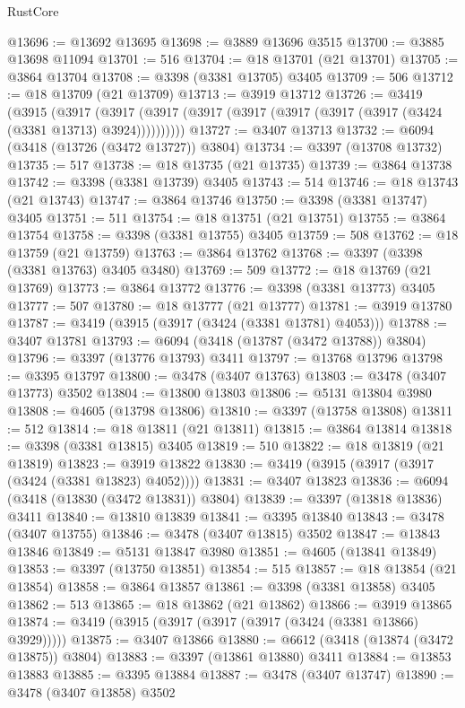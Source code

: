 \begin{lexlean}{RustCore}
\begin{coremodule}
@13696 := @13692 @13695
@13698 := @3889 @13696 @3515
@13700 := @3885 @13698 @11094
@13701 := 516
@13704 := @18 @13701 (@21 @13701)
@13705 := @3864 @13704
@13708 := @3398 (@3381 @13705) @3405
@13709 := 506
@13712 := @18 @13709 (@21 @13709)
@13713 := @3919 @13712
@13726 := @3419
    (@3915
      (@3917 (@3917 (@3917 (@3917 (@3917 (@3917 (@3917 (@3917 (@3424 (@3381 @13713) @3924))))))))))
@13727 := @3407 @13713
@13732 := @6094 (@3418 (@13726 (@3472 @13727)) @3804)
@13734 := @3397 (@13708 @13732)
@13735 := 517
@13738 := @18 @13735 (@21 @13735)
@13739 := @3864 @13738
@13742 := @3398 (@3381 @13739) @3405
@13743 := 514
@13746 := @18 @13743 (@21 @13743)
@13747 := @3864 @13746
@13750 := @3398 (@3381 @13747) @3405
@13751 := 511
@13754 := @18 @13751 (@21 @13751)
@13755 := @3864 @13754
@13758 := @3398 (@3381 @13755) @3405
@13759 := 508
@13762 := @18 @13759 (@21 @13759)
@13763 := @3864 @13762
@13768 := @3397 (@3398 (@3381 @13763) @3405 @3480)
@13769 := 509
@13772 := @18 @13769 (@21 @13769)
@13773 := @3864 @13772
@13776 := @3398 (@3381 @13773) @3405
@13777 := 507
@13780 := @18 @13777 (@21 @13777)
@13781 := @3919 @13780
@13787 := @3419 (@3915 (@3917 (@3424 (@3381 @13781) @4053)))
@13788 := @3407 @13781
@13793 := @6094 (@3418 (@13787 (@3472 @13788)) @3804)
@13796 := @3397 (@13776 @13793) @3411
@13797 := @13768 @13796
@13798 := @3395 @13797
@13800 := @3478 (@3407 @13763)
@13803 := @3478 (@3407 @13773) @3502
@13804 := @13800 @13803
@13806 := @5131 @13804 @3980
@13808 := @4605 (@13798 @13806)
@13810 := @3397 (@13758 @13808)
@13811 := 512
@13814 := @18 @13811 (@21 @13811)
@13815 := @3864 @13814
@13818 := @3398 (@3381 @13815) @3405
@13819 := 510
@13822 := @18 @13819 (@21 @13819)
@13823 := @3919 @13822
@13830 := @3419 (@3915 (@3917 (@3917 (@3424 (@3381 @13823) @4052))))
@13831 := @3407 @13823
@13836 := @6094 (@3418 (@13830 (@3472 @13831)) @3804)
@13839 := @3397 (@13818 @13836) @3411
@13840 := @13810 @13839
@13841 := @3395 @13840
@13843 := @3478 (@3407 @13755)
@13846 := @3478 (@3407 @13815) @3502
@13847 := @13843 @13846
@13849 := @5131 @13847 @3980
@13851 := @4605 (@13841 @13849)
@13853 := @3397 (@13750 @13851)
@13854 := 515
@13857 := @18 @13854 (@21 @13854)
@13858 := @3864 @13857
@13861 := @3398 (@3381 @13858) @3405
@13862 := 513
@13865 := @18 @13862 (@21 @13862)
@13866 := @3919 @13865
@13874 := @3419 (@3915 (@3917 (@3917 (@3917 (@3424 (@3381 @13866) @3929)))))
@13875 := @3407 @13866
@13880 := @6612 (@3418 (@13874 (@3472 @13875)) @3804)
@13883 := @3397 (@13861 @13880) @3411
@13884 := @13853 @13883
@13885 := @3395 @13884
@13887 := @3478 (@3407 @13747)
@13890 := @3478 (@3407 @13858) @3502

\end{coremodule}
\end{lexlean}
